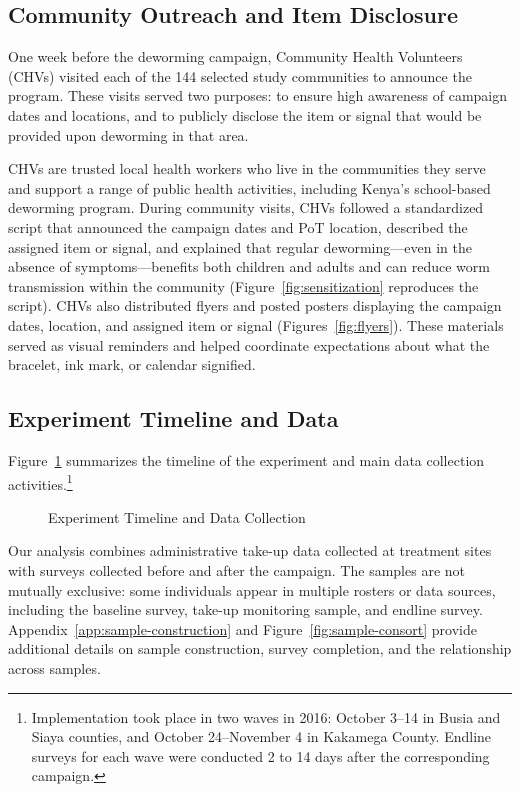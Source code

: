\documentclass[ECM\space ReStud.tex]{subfiles}
\begin{document}
\subsection{Community Outreach and Item Disclosure}\label{sec:info-campaign}

One week before the deworming campaign, Community Health Volunteers (CHVs) visited each of the 144 selected study communities to announce the program. These visits served two purposes: to ensure high awareness of campaign dates and locations, and to publicly disclose the item or signal that would be provided upon deworming in that area.

CHVs are trusted local health workers who live in the communities they serve and support a range of public health activities, including Kenya's school-based deworming program. During community visits, CHVs followed a standardized script that announced the campaign dates and PoT location, described the assigned item or signal, and explained that regular deworming---even in the absence of symptoms---benefits both children and adults and can reduce worm transmission within the community (Figure~\ref{fig:sensitization} reproduces the script). CHVs also distributed flyers and posted posters displaying the campaign dates, location, and assigned item or signal (Figures~\ref{fig:flyers}). These materials served as visual reminders and helped coordinate expectations about what the bracelet, ink mark, or calendar signified.

\subsection{Experiment Timeline and Data}

Figure~\ref{fig:timeline} summarizes the timeline of the experiment and main data collection activities.\footnote{Implementation took place in two waves in 2016: October 3--14 in Busia and Siaya counties, and October 24--November 4 in Kakamega County. Endline surveys for each wave were conducted 2 to 14 days after the corresponding campaign.}

\begin{figure}[htbp]
\centering

\caption{Experiment Timeline and Data Collection}
\label{fig:timeline}
\end{figure}

Our analysis combines administrative take-up data collected at treatment sites with surveys collected before and after the campaign. The samples are not mutually exclusive: some individuals appear in multiple rosters or data sources, including the baseline survey, take-up monitoring sample, and endline survey. Appendix~\ref{app:sample-construction} and Figure~\ref{fig:sample-consort} provide additional details on sample construction, survey completion, and the relationship across samples.
\end{document}

